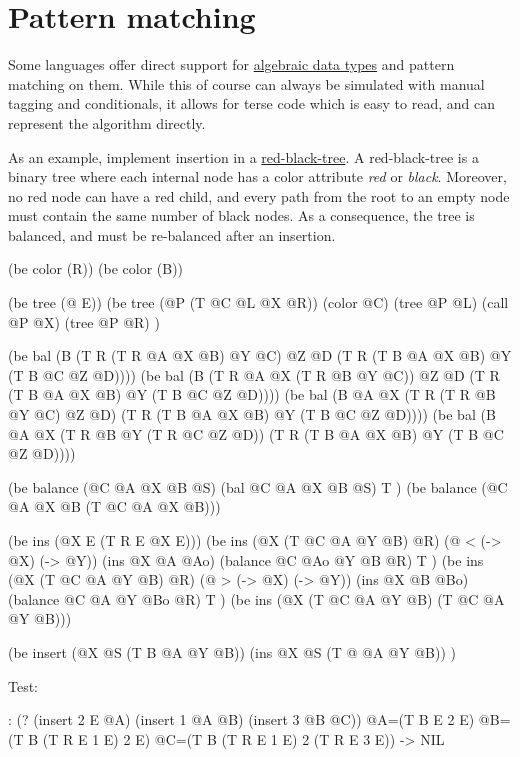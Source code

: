 \pagebreak{}
\section*{Pattern matching}

Some languages offer direct support for
\href{http://en.wikipedia.org/wiki/Algebraic\_data\_type}{algebraic data
types} and pattern matching on them. While this of course can always be
simulated with manual tagging and conditionals, it allows for terse code
which is easy to read, and can represent the algorithm directly.

As an example, implement insertion in a
\href{http://en.wikipedia.org/wiki/Red\_Black\_Tree}{red-black-tree}. A
red-black-tree is a binary tree where each internal node has a color
attribute \emph{red} or \emph{black}. Moreover, no red node can have a
red child, and every path from the root to an empty node must contain
the same number of black nodes. As a consequence, the tree is balanced,
and must be re-balanced after an insertion.

\begin{wideverbatim}

(be color (R))
(be color (B))

(be tree (@ E))
(be tree (@P (T @C @L @X @R))
   (color @C)
   (tree @P @L)
   (call @P @X)
   (tree @P @R) )

(be bal (B (T R (T R @A @X @B) @Y @C) @Z @D (T R (T B @A @X @B) @Y (T B @C @Z @D))))
(be bal (B (T R @A @X (T R @B @Y @C)) @Z @D (T R (T B @A @X @B) @Y (T B @C @Z @D))))
(be bal (B @A @X (T R (T R @B @Y @C) @Z @D) (T R (T B @A @X @B) @Y (T B @C @Z @D))))
(be bal (B @A @X (T R @B @Y (T R @C @Z @D)) (T R (T B @A @X @B) @Y (T B @C @Z @D))))

(be balance (@C @A @X @B @S)
   (bal @C @A @X @B @S)
   T )
(be balance (@C @A @X @B (T @C @A @X @B)))

(be ins (@X E (T R E @X E)))
(be ins (@X (T @C @A @Y @B) @R)
   (@ < (-> @X) (-> @Y))
   (ins @X @A @Ao)
   (balance @C @Ao @Y @B @R)
   T )
(be ins (@X (T @C @A @Y @B) @R)
   (@ > (-> @X) (-> @Y))
   (ins @X @B @Bo)
   (balance @C @A @Y @Bo @R)
   T )
(be ins (@X (T @C @A @Y @B) (T @C @A @Y @B)))

(be insert (@X @S (T B @A @Y @B))
   (ins @X @S (T @ @A @Y @B)) )

Test:

: (? (insert 2 E @A) (insert 1 @A @B) (insert 3 @B @C))
 @A=(T B E 2 E) @B=(T B (T R E 1 E) 2 E) @C=(T B (T R E 1 E) 2 (T R E 3 E))
-> NIL

\end{wideverbatim}

